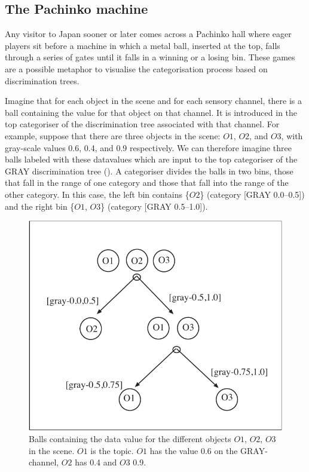 \subsection{The Pachinko machine}

Any visitor to Japan sooner or later comes across a 
Pachinko hall where eager players sit before a 
machine in which a metal ball, inserted at the top, 
falls through a series of gates until it falls in 
a winning or a losing bin. These games are
a possible metaphor to visualise the categorisation process
based on discrimination trees. 

Imagine that for each object in
the scene and for each sensory channel, there is a ball
containing the value for that object on that channel. It
is introduced in the top categoriser of the 
discrimination tree associated with that channel. 
For example, suppose that there are three
objects in the scene: $O1$, $O2$, and $O3$, 
with gray-scale values 0.6, 0.4, and 0.9 respectively. 
We can therefore imagine three balls labeled with these datavalues
which are input to the top categoriser of the 
GRAY discrimination tree (). 
A categoriser divides the balls in two bins, 
those that fall in the range of 
one category and those that fall into the range of the other
category. In this case, the left bin contains \{$O2$\} 
(category [GRAY 0.0–0.5]) 
and the right bin \{$O1$, $O3$\} (category [GRAY 0.5–1.0]). 

\begin{figure}[htbp]
  \centerline{\includegraphics[width=.65\textwidth]{chap4/figs/balls.pdf}}
\caption{\label{balls}Balls containing
the data value for the different objects
$O1$, $O2$, $O3$ in the scene. $O1$ is the topic.
$O1$ has the value 0.6 on the GRAY-channel, $O2$ has
0.4 and $O3$ 0.9.} 
\end{figure}

